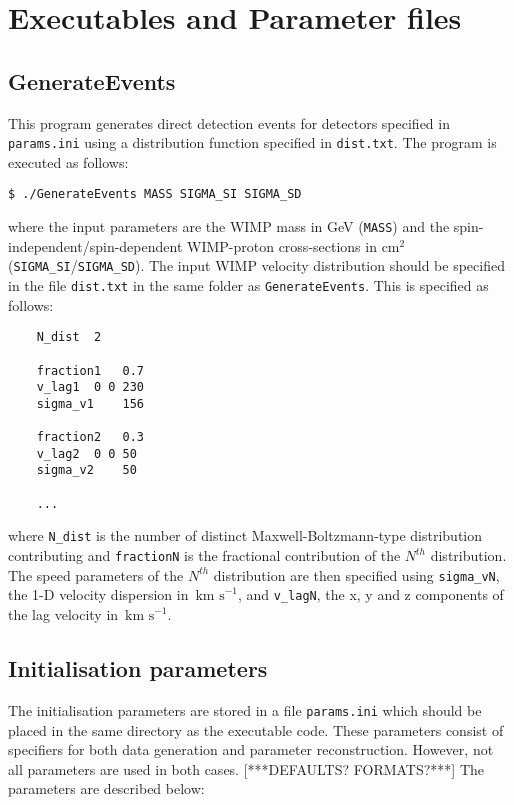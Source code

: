 \documentclass[a4paper]{article}
\newcommand{\kms}{\ensuremath{\,\textrm{km s}^{-1}}}
\begin{document}
\section{Executables and Parameter files}

\subsection{GenerateEvents}

This program generates direct detection events for detectors specified in \texttt{params.ini} using a distribution function specified in \texttt{dist.txt}. The program is executed as follows:

\begin{lstlisting}[style=BashInputStyle]
    $ ./GenerateEvents MASS SIGMA_SI SIGMA_SD
\end{lstlisting}
where the input parameters are the WIMP mass in GeV (\texttt{MASS}) and the spin-independent/spin-dependent WIMP-proton cross-sections in $\textrm{cm}^2$ (\texttt{SIGMA\_SI}/\texttt{SIGMA\_SD}). The input WIMP velocity distribution should be specified in the file \texttt{dist.txt} in the same folder as \texttt{GenerateEvents}. This is specified as follows:

\begin{lstlisting}
    N_dist	2

    fraction1	0.7
    v_lag1	0 0 230
    sigma_v1	156

    fraction2	0.3
    v_lag2	0 0 50
    sigma_v2	50

    ...
\end{lstlisting}
where \texttt{N\_dist} is the number of distinct Maxwell-Boltzmann-type distribution contributing and \texttt{fractionN} is the fractional contribution of the $N^{th}$ distribution. The speed parameters of the $N^{th}$ distribution are then specified using \texttt{sigma\_vN}, the 1-D velocity dispersion in \kms, and \texttt{v\_lagN}, the x, y and z components of the lag velocity in \kms.

\subsection{Initialisation parameters}

The initialisation parameters are stored in a file \texttt{params.ini} which should be placed in the same directory as the executable code. These parameters consist of specifiers for both data generation and parameter reconstruction. However, not all parameters are used in both cases. [***DEFAULTS? FORMATS?***] The parameters are described below:
\end{document}
